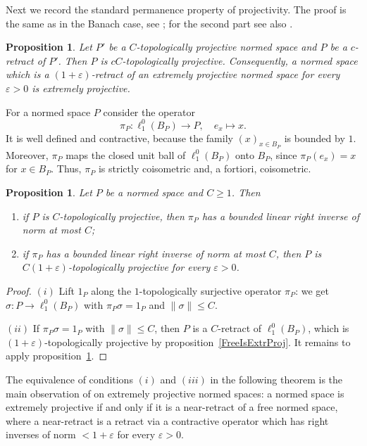 \documentclass[12pt]{article}
\newtheorem{proposition}[theorem]{Proposition}
\newcommand{\lo}[1]{\ell_1^0(#1)}
\newcommand{\norm}[1]{\lVert #1\rVert}
\begin{document}
Next we record the standard permanence property of projectivity. The proof
is the same as in the Banach case, see \cite[lemma 2.7]{WhiteInjmoduAlg};
for the second part see also
\cite[proposition 1.1]{HelExtrProjSeqAlg}.

\begin{proposition}\label{RetractOfProj} Let $P'$ be a $C$-topologically
    projective normed space and $P$ be a $c$-retract of $P'$. Then $P$ is
    $cC$-topologically projective. Consequently, a normed space which is a
    $(1+\varepsilon)$-retract of an extremely projective normed space for every
    $\varepsilon>0$ is extremely projective.
\end{proposition}

For a normed space $P$ consider the operator
\[
\pi_P:\lo{B_P}\to P,\quad e_x\mapsto x.
\]
It is well defined and contractive, because the family
${(x)}_{x\in B_P}$ is bounded by $1$. Moreover, $\pi_P$ maps the closed unit
ball of $\lo{B_P}$ onto $B_P$, since $\pi_P(e_x)=x$ for $x\in B_P$. Thus,
$\pi_P$ is strictly coisometric and, a fortiori, coisometric.

\begin{proposition}\label{CanonicalMorphismCriterion} Let $P$ be a normed
    space and $C\geq 1$. Then
    \begin{enumerate}[label = (\roman*)]
        \item if $P$ is $C$-topologically projective, then $\pi_P$ has a bounded linear right
              inverse of norm at most $C$;
        \item if $\pi_P$ has a bounded linear right inverse of norm at
              most $C$, then $P$ is $C(1+\varepsilon)$-topologically projective
              for every $\varepsilon>0$.
    \end{enumerate}
\end{proposition}
\begin{proof} $(i)$ Lift $1_P$ along the $1$-topologically surjective operator
    $\pi_P$: we get $\sigma:P\to\lo{B_P}$ with $\pi_P\sigma=1_P$ and
    $\norm{\sigma}\leq C$.

    $(ii)$ If $\pi_P\sigma=1_P$ with $\norm{\sigma}\leq C$, then $P$ is a
    $C$-retract of $\lo{B_P}$, which is $(1+\varepsilon)$-topologically
    projective by proposition~\ref{FreeIsExtrProj}. It remains to apply
    proposition~\ref{RetractOfProj}.
\end{proof}

The equivalence of conditions $(i)$ and $(iii)$ in the following theorem is
the main observation of \cite[section 2]{HelExtrProjSeqAlg} on extremely
projective normed spaces: a normed space is extremely projective if and only
if it is a near-retract of a free normed space, where a near-retract is a
retract via a contractive operator which has right inverses of norm
$<1+\varepsilon$ for every $\varepsilon>0$.
\end{document}
